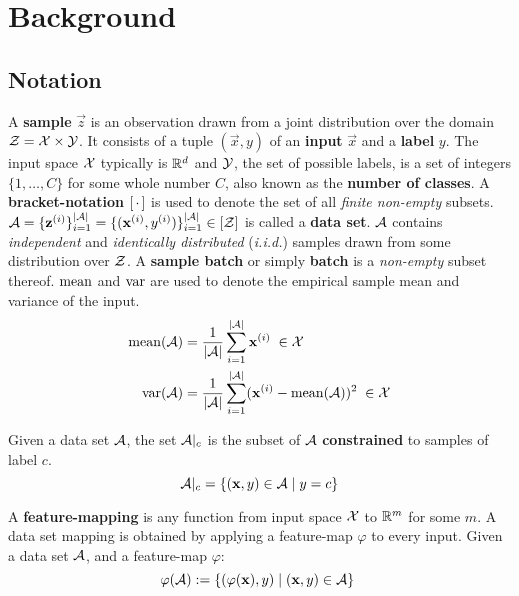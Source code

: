 

\chapter{Background}
\label{chap:Background}

\section{Notation}

A \textbf{sample} $\vec z$ is an observation drawn from a joint distribution over the domain $\mathcal Z = \mathcal X \times \mathcal Y$. 
It consists of a tuple $(\vec x, y)$ of an \textbf{input} $\vec x$ and a \textbf{label} $y$. 
The input space $\mathcal X$ typically is $\mathbb{R}^d$ and $\mathcal Y$, the set of possible labels, is a set of integers $\{1, \dots, C\}$ for some whole number $C$, also known as the \textbf{number of classes}.
A \textbf{bracket-notation} $[\, \cdot \,]$ is used to denote the set of all \textit{finite non-empty} subsets.
$\mathcal A = \{\mathbf z^{(i)}\}_{i=1}^{| \mathcal A |} = \{(\mathbf x^{(i)}, y^{(i)})\}_{i=1}^{| \mathcal A |} \in [\mathcal Z]$ is called a \textbf{data set}. $\mathcal A $ contains \textit{independent} and \textit{identically distributed} (\textit{i.i.d.}) samples drawn from some distribution over $\mathcal Z$.
A \textbf{sample batch} or simply \textbf{batch} is a \textit{non-empty} subset thereof.
$\operatorname{mean}$ and $\operatorname{var}$ are used to denote the empirical sample mean and variance of the input.
\begin{align}
    \operatorname{mean} ({\mathcal A}) &= \frac 1 {\lvert \mathcal A \rvert} \sum _{i=1}^{\lvert \mathcal A \rvert} \mathbf x^{(i)} \; \in \mathcal X
    \label{eqn:sample_mean} \\
    \operatorname{var} ({\mathcal A}) &= \frac 1 {\lvert \mathcal A \rvert} \sum _{i=1}^{\lvert \mathcal A \rvert} (\mathbf x^{(i)} - \operatorname{mean} ({\mathcal A}))^2 \; \in \mathcal X 
    \label{eqn:sample_var} 
\end{align}


Given a data set $\mathcal A$, the set $\mathcal A|_c$ is the subset of $\mathcal A$ \textbf{constrained} to samples of label $c$.
\begin{equation}
    \mathcal A|_c = \{(\mathbf x, y) \in \mathcal A \mid y = c\}
    \label{eqn:class_constrained}
\end{equation}

A \textbf{feature-mapping} is any function from input space $\mathcal X$ to $\mathbb{R}^m$ for some $m$.
A data set mapping is obtained by applying a feature-map $\varphi$ to every input. Given a data set $\mathcal A$, and a feature-map $\varphi$:
\begin{equation}
    \varphi(\mathcal A) := \{(\varphi(\mathbf x), y) \mid (\mathbf x, y) \in \mathcal A\} \;
    \label{eqn:feature_mapping}
\end{equation}



